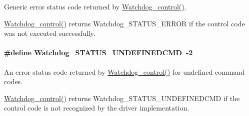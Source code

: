 Generic error status code returned by \hyperlink{_watchdog_8h_aa98a75361edb1e476432669169f2950e}{Watchdog\+\_\+control()}. 

\hyperlink{_watchdog_8h_aa98a75361edb1e476432669169f2950e}{Watchdog\+\_\+control()} returns Watchdog\+\_\+\+S\+T\+A\+T\+U\+S\+\_\+\+E\+R\+R\+O\+R if the control code was not executed successfully. 
\paragraph[{Watchdog\+\_\+\+S\+T\+A\+T\+U\+S\+\_\+\+U\+N\+D\+E\+F\+I\+N\+E\+D\+C\+M\+D}]{\setlength{\rightskip}{0pt plus 5cm}\#define Watchdog\+\_\+\+S\+T\+A\+T\+U\+S\+\_\+\+U\+N\+D\+E\+F\+I\+N\+E\+D\+C\+M\+D~-\/2}\label{group___watchdog___s_t_a_t_u_s_ga589be79a7f8ce642863f231e1dae7577}


An error status code returned by \hyperlink{_watchdog_8h_aa98a75361edb1e476432669169f2950e}{Watchdog\+\_\+control()} for undefined command codes. 

\hyperlink{_watchdog_8h_aa98a75361edb1e476432669169f2950e}{Watchdog\+\_\+control()} returns Watchdog\+\_\+\+S\+T\+A\+T\+U\+S\+\_\+\+U\+N\+D\+E\+F\+I\+N\+E\+D\+C\+M\+D if the control code is not recognized by the driver implementation. 